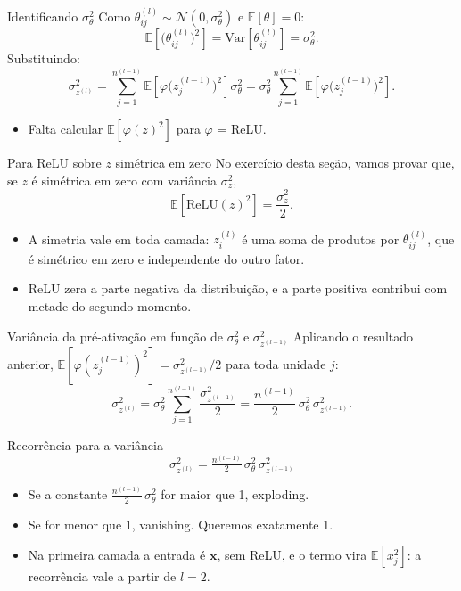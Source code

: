 \documentclass[aspectratio=169,xcolor=dvipsnames]{beamer}
\begin{document}
  \begin{frame}{Identificando $\sigma_\theta^2$}
    Como $\theta^{(l)}_{ij}\sim\mathcal{N}(0,\sigma_\theta^2)$ e $\mathbb{E}[\theta]=0$:
    \[
      \mathbb{E}\!\left[\big(\theta^{(l)}_{ij}\big)^2\right]
        = \mathrm{Var}[\theta^{(l)}_{ij}] = \sigma_\theta^2.
    \]
    Substituindo:
    \[
      \sigma^2_{z^{(l)}}
        = \sum_{j=1}^{n^{(l-1)}} \mathbb{E}\!\left[\varphi\!\big(z^{(l-1)}_j\big)^2\right]\sigma_\theta^2
        = \sigma_\theta^2 \sum_{j=1}^{n^{(l-1)}} \mathbb{E}\!\left[\varphi\!\big(z^{(l-1)}_j\big)^2\right].
    \]
    \begin{itemize}
      \item Falta calcular $\mathbb{E}[\varphi(z)^2]$ para $\varphi$ = ReLU.
    \end{itemize}
  \end{frame}

  \begin{frame}{Para ReLU sobre $z$ simétrica em zero}
    No exercício desta seção, vamos provar que, se $z$ é simétrica em zero com
    variância $\sigma_z^2$,
    \[
      \mathbb{E}[\mathrm{ReLU}(z)^2] = \frac{\sigma_z^2}{2}.
    \]
    \begin{itemize}
      \item A simetria vale em toda camada: $z^{(l)}_i$ é uma soma de produtos por
        $\theta^{(l)}_{ij}$, que é simétrico em zero e independente do outro fator.
      \item ReLU zera a parte negativa da distribuição, e a parte positiva contribui
        com metade do segundo momento.
    \end{itemize}
  \end{frame}

  \begin{frame}{Variância da pré-ativação em função de $\sigma_\theta^2$ e $\sigma^2_{z^{(l-1)}}$}
    Aplicando o resultado anterior, $\mathbb{E}[\varphi(z^{(l-1)}_j)^2] = \sigma^2_{z^{(l-1)}}/2$
    para toda unidade $j$:
    \[
      \sigma^2_{z^{(l)}}
        = \sigma_\theta^2 \sum_{j=1}^{n^{(l-1)}} \frac{\sigma^2_{z^{(l-1)}}}{2}
        = \frac{n^{(l-1)}}{2}\,\sigma_\theta^2\,\sigma^2_{z^{(l-1)}}.
    \]
    \vfill
    \begin{block}{Recorrência para a variância}
      \[
        \boxed{\;\sigma^2_{z^{(l)}} = \tfrac{n^{(l-1)}}{2}\,\sigma_\theta^2\,\sigma^2_{z^{(l-1)}}\;}
      \]
    \end{block}
    \begin{itemize}
      \item Se a constante $\tfrac{n^{(l-1)}}{2}\,\sigma_\theta^2$ for maior que 1, exploding.
      \item Se for menor que 1, vanishing. Queremos exatamente 1.
      \item Na primeira camada a entrada é $\mathbf{x}$, sem ReLU, e o termo
        vira $\mathbb{E}[x_j^2]$: a recorrência vale a partir de $l=2$.
    \end{itemize}
  \end{frame}
\end{document}
